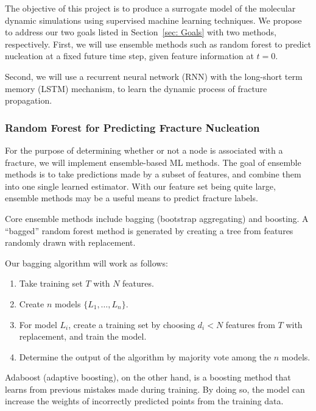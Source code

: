 The objective of this project is to produce a surrogate model of the molecular dynamic simulations using supervised machine learning techniques. We propose to address our two goals listed in Section~\ref{sec: Goals} with two methods, respectively. First, we will use ensemble methods such as random forest to predict nucleation at a fixed future time step, given feature information at $t=0$.

Second, we will use a recurrent neural network (RNN) with the long-short term memory (LSTM) mechanism, to learn the dynamic process of fracture propagation.

\subsubsection{Random Forest for Predicting Fracture Nucleation}

For the purpose of determining whether or not a node is associated with a fracture, we will implement ensemble-based ML methods. The goal of ensemble methods is to take predictions made by a subset of features, and combine them into one single learned estimator. With our feature set being quite large, ensemble methods may be a useful means to predict fracture labels. 

Core ensemble methods include bagging (bootstrap aggregating) and boosting. A ``bagged'' random forest method is generated by creating a tree from features randomly drawn with replacement. 

Our bagging algorithm will work as follows:

\begin{enumerate}
\item Take training set $T$ with $N$ features.
\item Create $n$ models $\{L_1,\dots,L_n\}$.
\item For model $L_i$, create a training set by choosing $d_i<N$ features from $T$ with replacement, and train the model.
\item Determine the output of the algorithm by majority vote among the $n$ models.
\end{enumerate}

Adaboost (adaptive boosting), on the other hand, is a boosting method that learns from previous mistakes made during training. By doing so, the model can increase the weights of incorrectly predicted points from the training data.

